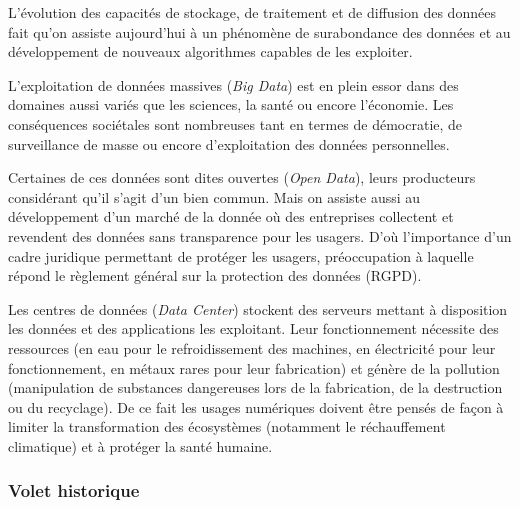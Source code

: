 \begin{tcolorbox}[title={Impacts sur les pratiques humaines}, toprule=0pt, leftrule=0pt, rightrule=0pt, arc=0pt,
                  fonttitle=\scshape\boxtitlefont,
                  colbacktitle=white, coltitle=firstcolor, colframe=firstcolor, colback=firstcolor!10,
                  breakable, enhanced jigsaw]
L’évolution des capacités de stockage, de traitement et de diffusion des données fait qu’on assiste aujourd’hui à un phénomène de surabondance des données et au développement de nouveaux algorithmes capables de les exploiter.

L’exploitation de données massives (\textit{Big Data}) est en plein essor dans des domaines aussi variés que les sciences, la santé ou encore l’économie. Les conséquences sociétales sont nombreuses tant en termes de démocratie, de surveillance de masse ou encore d’exploitation des données personnelles.

Certaines de ces données sont dites ouvertes (\textit{Open Data}), leurs producteurs considérant qu’il s’agit d’un bien commun. Mais on assiste aussi au développement d’un marché de la donnée où des entreprises collectent et revendent des données sans transparence pour les usagers. D’où l’importance d’un cadre juridique permettant de protéger les usagers, préoccupation à laquelle répond le règlement général sur la protection des données (RGPD).

Les centres de données (\textit{Data Center}) stockent des serveurs mettant à disposition les données et des applications les exploitant. Leur fonctionnement nécessite des ressources (en eau pour le refroidissement des machines, en électricité pour leur fonctionnement, en métaux rares pour leur fabrication) et génère de la pollution (manipulation de substances dangereuses lors de la fabrication, de la destruction ou du recyclage). De ce fait les usages numériques doivent être pensés de façon à limiter la transformation des écosystèmes (notamment le réchauffement climatique) et à protéger la santé humaine. 
\end{tcolorbox}

\subsubsection[Volet historique]{Volet historique}
\label{subsub:VIII.1.1.2}

